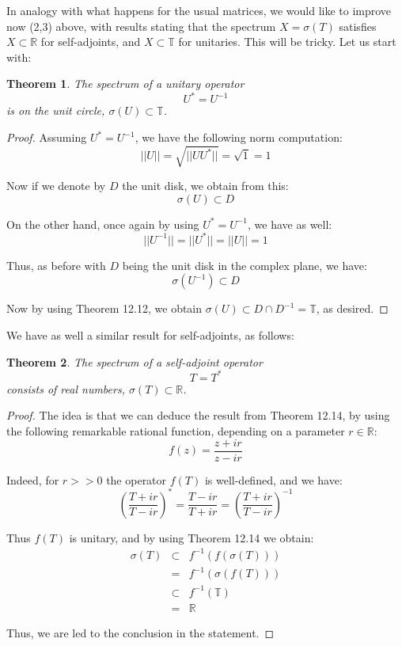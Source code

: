 \documentclass[12pt]{amsbook}
\newtheorem{theorem}{Theorem}[chapter]
\begin{document}
In analogy with what happens for the usual matrices, we would like to improve now (2,3) above, with results stating that the spectrum $X=\sigma(T)$ satisfies $X\subset\mathbb R$ for self-adjoints, and $X\subset\mathbb T$ for unitaries. This will be tricky. Let us start with:


\begin{theorem}
The spectrum of a unitary operator 
$$U^*=U^{-1}$$
is on the unit circle, $\sigma(U)\subset\mathbb T$. 
\end{theorem}

\begin{proof}
Assuming $U^*=U^{-1}$, we have the following norm computation:
$$||U||
=\sqrt{||UU^*||}
=\sqrt{1}
=1$$

Now if we denote by $D$ the unit disk, we obtain from this:
$$\sigma(U)\subset D$$

On the other hand, once again by using $U^*=U^{-1}$, we have as well:
$$||U^{-1}||
=||U^*||
=||U||
=1$$

Thus, as before with $D$ being the unit disk in the complex plane, we have:
$$\sigma(U^{-1})\subset D$$

Now by using Theorem 12.12, we obtain $\sigma(U)
\subset D\cap D^{-1}
=\mathbb T$, as desired.
\end{proof}

We have as well a similar result for self-adjoints, as follows:


\begin{theorem}
The spectrum of a self-adjoint operator
$$T=T^*$$
consists of real numbers, $\sigma(T)\subset\mathbb R$.
\end{theorem}

\begin{proof}
The idea is that we can deduce the result from Theorem 12.14, by using the following remarkable rational function, depending on a parameter $r\in\mathbb R$:
$$f(z)=\frac{z+ir}{z-ir}$$

Indeed, for $r>>0$ the operator $f(T)$ is well-defined, and we have:
$$\left(\frac{T+ir}{T-ir}\right)^*
=\frac{T-ir}{T+ir}
=\left(\frac{T+ir}{T-ir}\right)^{-1}$$

Thus $f(T)$ is unitary, and by using Theorem 12.14 we obtain:
\begin{eqnarray*}
\sigma(T)
&\subset&f^{-1}(f(\sigma(T)))\\
&=&f^{-1}(\sigma(f(T)))\\
&\subset&f^{-1}(\mathbb T)\\
&=&\mathbb R
\end{eqnarray*}

Thus, we are led to the conclusion in the statement.
\end{proof}
\end{document}
